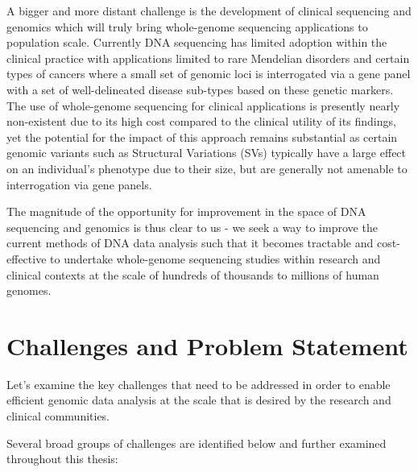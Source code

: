 A bigger and more distant challenge is the development of clinical sequencing and genomics which will truly bring whole-genome sequencing applications to population scale. Currently DNA sequencing has limited adoption within the clinical practice with applications limited to rare Mendelian disorders\autocite{lee2014clinical} and certain types of cancers\autocite{robinson2015integrative} where a small set of genomic loci is interrogated via a gene panel\autocite{allegra2009american} with a set of well-delineated disease sub-types based on these genetic markers. The use of whole-genome sequencing for clinical applications is presently nearly non-existent due to its high cost compared to the clinical utility of its findings, yet the potential for the impact of this approach remains substantial as certain genomic variants such as Structural Variations (SVs) typically have a large effect on an individual's phenotype due to their size\autocite{pleasance2010comprehensive}, but are generally not amenable to interrogation via gene panels.

The magnitude of the opportunity for improvement in the space of DNA sequencing and genomics is thus clear to us - we seek a way to improve the current methods of DNA data analysis such that it becomes tractable and cost-effective to undertake whole-genome sequencing studies within research and clinical contexts at the scale of hundreds of thousands to millions of human genomes.        

\section{Challenges and Problem Statement}
\label{sec:challenges}

Let's examine the key challenges that need to be addressed in order to enable efficient genomic data analysis at the scale that is desired by the research and clinical communities.

Several broad groups of challenges are identified below and further examined throughout this thesis:


